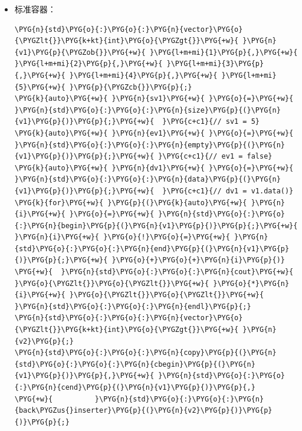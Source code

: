 \begin{itemize}
\item 标准容器：



\begin{codeblockbg}
\begin{Verbatim}[commandchars=\\\{\},breaklines=true,breakanywhere=true,fontsize=\codefont,xleftmargin=17bp]
\PYG{n}{std}\PYG{o}{:}\PYG{o}{:}\PYG{n}{vector}\PYG{o}{\PYGZlt{}}\PYG{k+kt}{int}\PYG{o}{\PYGZgt{}}\PYG{+w}{ }\PYG{n}{v1}\PYG{p}{\PYGZob{}}\PYG{+w}{ }\PYG{l+m+mi}{1}\PYG{p}{,}\PYG{+w}{ }\PYG{l+m+mi}{2}\PYG{p}{,}\PYG{+w}{ }\PYG{l+m+mi}{3}\PYG{p}{,}\PYG{+w}{ }\PYG{l+m+mi}{4}\PYG{p}{,}\PYG{+w}{ }\PYG{l+m+mi}{5}\PYG{+w}{ }\PYG{p}{\PYGZcb{}}\PYG{p}{;}
\PYG{k}{auto}\PYG{+w}{ }\PYG{n}{sv1}\PYG{+w}{ }\PYG{o}{=}\PYG{+w}{ }\PYG{n}{std}\PYG{o}{:}\PYG{o}{:}\PYG{n}{size}\PYG{p}{(}\PYG{n}{v1}\PYG{p}{)}\PYG{p}{;}\PYG{+w}{  }\PYG{c+c1}{// sv1 = 5}
\PYG{k}{auto}\PYG{+w}{ }\PYG{n}{ev1}\PYG{+w}{ }\PYG{o}{=}\PYG{+w}{ }\PYG{n}{std}\PYG{o}{:}\PYG{o}{:}\PYG{n}{empty}\PYG{p}{(}\PYG{n}{v1}\PYG{p}{)}\PYG{p}{;}\PYG{+w}{ }\PYG{c+c1}{// ev1 = false}
\PYG{k}{auto}\PYG{+w}{ }\PYG{n}{dv1}\PYG{+w}{ }\PYG{o}{=}\PYG{+w}{ }\PYG{n}{std}\PYG{o}{:}\PYG{o}{:}\PYG{n}{data}\PYG{p}{(}\PYG{n}{v1}\PYG{p}{)}\PYG{p}{;}\PYG{+w}{  }\PYG{c+c1}{// dv1 = v1.data()}
\PYG{k}{for}\PYG{+w}{ }\PYG{p}{(}\PYG{k}{auto}\PYG{+w}{ }\PYG{n}{i}\PYG{+w}{ }\PYG{o}{=}\PYG{+w}{ }\PYG{n}{std}\PYG{o}{:}\PYG{o}{:}\PYG{n}{begin}\PYG{p}{(}\PYG{n}{v1}\PYG{p}{)}\PYG{p}{;}\PYG{+w}{ }\PYG{n}{i}\PYG{+w}{ }\PYG{o}{!}\PYG{o}{=}\PYG{+w}{ }\PYG{n}{std}\PYG{o}{:}\PYG{o}{:}\PYG{n}{end}\PYG{p}{(}\PYG{n}{v1}\PYG{p}{)}\PYG{p}{;}\PYG{+w}{ }\PYG{o}{+}\PYG{o}{+}\PYG{n}{i}\PYG{p}{)}
\PYG{+w}{  }\PYG{n}{std}\PYG{o}{:}\PYG{o}{:}\PYG{n}{cout}\PYG{+w}{ }\PYG{o}{\PYGZlt{}}\PYG{o}{\PYGZlt{}}\PYG{+w}{ }\PYG{o}{*}\PYG{n}{i}\PYG{+w}{ }\PYG{o}{\PYGZlt{}}\PYG{o}{\PYGZlt{}}\PYG{+w}{ }\PYG{n}{std}\PYG{o}{:}\PYG{o}{:}\PYG{n}{endl}\PYG{p}{;}
\PYG{n}{std}\PYG{o}{:}\PYG{o}{:}\PYG{n}{vector}\PYG{o}{\PYGZlt{}}\PYG{k+kt}{int}\PYG{o}{\PYGZgt{}}\PYG{+w}{ }\PYG{n}{v2}\PYG{p}{;}
\PYG{n}{std}\PYG{o}{:}\PYG{o}{:}\PYG{n}{copy}\PYG{p}{(}\PYG{n}{std}\PYG{o}{:}\PYG{o}{:}\PYG{n}{cbegin}\PYG{p}{(}\PYG{n}{v1}\PYG{p}{)}\PYG{p}{,}\PYG{+w}{ }\PYG{n}{std}\PYG{o}{:}\PYG{o}{:}\PYG{n}{cend}\PYG{p}{(}\PYG{n}{v1}\PYG{p}{)}\PYG{p}{,}
\PYG{+w}{          }\PYG{n}{std}\PYG{o}{:}\PYG{o}{:}\PYG{n}{back\PYGZus{}inserter}\PYG{p}{(}\PYG{n}{v2}\PYG{p}{)}\PYG{p}{)}\PYG{p}{;}
\end{Verbatim}
\end{codeblockbg}



\end{itemize}
